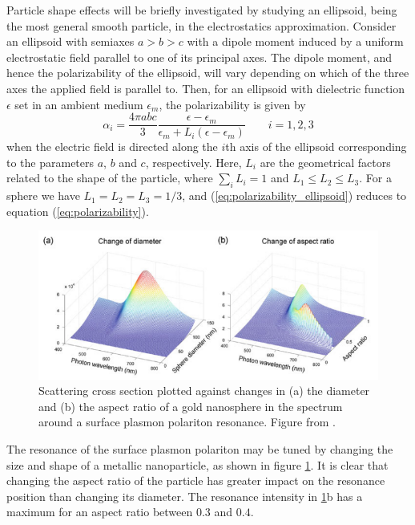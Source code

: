 Particle shape effects will be briefly investigated by studying an ellipsoid, being the most general smooth particle, in the electrostatics approximation. Consider an ellipsoid with semiaxes $a>b>c$ with a dipole moment induced by a uniform electrostatic field parallel to one of its principal axes. The dipole moment, and hence the polarizability of the ellipsoid, will vary depending on which of the three axes the applied field is parallel to. Then, for an ellipsoid with dielectric function $\epsilon$ set in an ambient medium $\epsilon_m$, the polarizability is given by \cite{BH}
\begin{equation}
    \alpha_i = \frac{4\pi abc}{3} \frac{\epsilon-\epsilon_m}{\epsilon_m + L_i(\epsilon-\epsilon_m)} \quad\quad i=1,2,3
    \label{eq:polarizability_ellipsoid}
\end{equation}
when the electric field is directed along the $i$th axis of the ellipsoid corresponding to the parameters $a$, $b$ and $c$, respectively. Here, $L_i$ are the geometrical factors related to the shape of the particle, where $\sum_i L_i=1$ and $L_1\leq L_2 \leq L_3$. For a sphere we have $L_1=L_2=L_3=1/3$, and (\ref{eq:polarizability_ellipsoid}) reduces to equation (\ref{eq:polarizability}).

\begin{figure}[h]
    \centering
    \includegraphics[width=\linewidth]{figures/Ch2/TuningLSPR.png}
    \caption{Scattering cross section plotted against changes in (a) the diameter and (b) the aspect ratio of a gold nanosphere in the spectrum around a surface plasmon polariton resonance. Figure from \cite{Trugler_metallicnanoparticles}.}
    \label{fig:tuning_plasmon_resonance}
\end{figure}

The resonance of the surface plasmon polariton may be tuned by changing the size and shape of a metallic nanoparticle, as shown in figure \ref{fig:tuning_plasmon_resonance}. It is clear that changing the aspect ratio of the particle has greater impact on the resonance position than changing its diameter. The resonance intensity in \ref{fig:tuning_plasmon_resonance}b has a maximum for an aspect ratio between $0.3$ and $0.4$\cite{Trugler_metallicnanoparticles}\cite{Becker_aspectratio_goldnanorods}.

